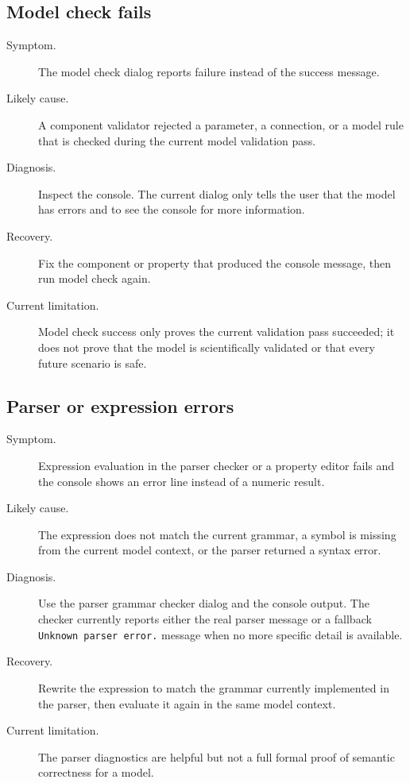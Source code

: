 \subsection{Model check fails}
\label{subsec:troubleshooting-model-check}

\begin{description}
\item[Symptom.] The model check dialog reports failure instead of the success
message.
\item[Likely cause.] A component validator rejected a parameter, a connection,
or a model rule that is checked during the current model validation pass.
\item[Diagnosis.] Inspect the console. The current dialog only tells the user
that the model has errors and to see the console for more information.
\item[Recovery.] Fix the component or property that produced the console
message, then run model check again.
\item[Current limitation.] Model check success only proves the current
validation pass succeeded; it does not prove that the model is scientifically
validated or that every future scenario is safe.
\end{description}

\subsection{Parser or expression errors}
\label{subsec:troubleshooting-parser}

\begin{description}
\item[Symptom.] Expression evaluation in the parser checker or a property
editor fails and the console shows an error line instead of a numeric result.
\item[Likely cause.] The expression does not match the current grammar, a
symbol is missing from the current model context, or the parser returned a
syntax error.
\item[Diagnosis.] Use the parser grammar checker dialog and the console output.
The checker currently reports either the real parser message or a fallback
\texttt{Unknown parser error.} message when no more specific detail is
available.
\item[Recovery.] Rewrite the expression to match the grammar currently
implemented in the parser, then evaluate it again in the same model context.
\item[Current limitation.] The parser diagnostics are helpful but not a full
formal proof of semantic correctness for a model.
\end{description}

